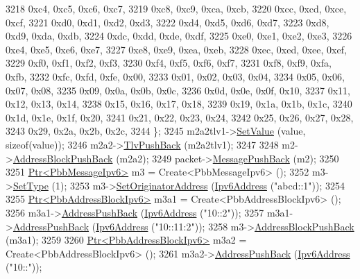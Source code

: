 \begin{DoxyCode}
3218       0xc4, 0xc5, 0xc6, 0xc7,
3219       0xc8, 0xc9, 0xca, 0xcb,
3220       0xcc, 0xcd, 0xce, 0xcf,
3221       0xd0, 0xd1, 0xd2, 0xd3,
3222       0xd4, 0xd5, 0xd6, 0xd7,
3223       0xd8, 0xd9, 0xda, 0xdb,
3224       0xdc, 0xdd, 0xde, 0xdf,
3225       0xe0, 0xe1, 0xe2, 0xe3,
3226       0xe4, 0xe5, 0xe6, 0xe7,
3227       0xe8, 0xe9, 0xea, 0xeb,
3228       0xec, 0xed, 0xee, 0xef,
3229       0xf0, 0xf1, 0xf2, 0xf3,
3230       0xf4, 0xf5, 0xf6, 0xf7,
3231       0xf8, 0xf9, 0xfa, 0xfb,
3232       0xfc, 0xfd, 0xfe, 0x00,
3233       0x01, 0x02, 0x03, 0x04,
3234       0x05, 0x06, 0x07, 0x08,
3235       0x09, 0x0a, 0x0b, 0x0c,
3236       0x0d, 0x0e, 0x0f, 0x10,
3237       0x11, 0x12, 0x13, 0x14,
3238       0x15, 0x16, 0x17, 0x18,
3239       0x19, 0x1a, 0x1b, 0x1c,
3240       0x1d, 0x1e, 0x1f, 0x20,
3241       0x21, 0x22, 0x23, 0x24,
3242       0x25, 0x26, 0x27, 0x28,
3243       0x29, 0x2a, 0x2b, 0x2c,
3244     \};
3245     m2a2tlv1->\hyperlink{classns3_1_1PbbTlv_a1ca7d32f9b68990225f3267c2cc09f11}{SetValue} (value, \textcolor{keyword}{sizeof}(value));
3246     m2a2->\hyperlink{classns3_1_1PbbAddressBlock_a6e33cd1452dd3ff753de3e3c99e473a5}{TlvPushBack} (m2a2tlv1);
3247 
3248     m2->\hyperlink{classns3_1_1PbbMessage_a5f623bad2fb1adde7da885e1c92d5311}{AddressBlockPushBack} (m2a2);
3249     packet->\hyperlink{classns3_1_1PbbPacket_a4a3170001ef758d9c9c4375b8f089826}{MessagePushBack} (m2);
3250 
3251     \hyperlink{classns3_1_1Ptr}{Ptr<PbbMessageIpv6>} m3 = Create<PbbMessageIpv6> ();
3252     m3->\hyperlink{classns3_1_1PbbMessage_a4b3d1eaabd3e7412a46ac79bf3360dac}{SetType} (1);
3253     m3->\hyperlink{classns3_1_1PbbMessage_a52ac135a2bec53db5e8f46b8b8a25e7c}{SetOriginatorAddress} (\hyperlink{classns3_1_1Ipv6Address}{Ipv6Address} (\textcolor{stringliteral}{"abcd::1"}));
3254 
3255     \hyperlink{classns3_1_1Ptr}{Ptr<PbbAddressBlockIpv6>} m3a1 = Create<PbbAddressBlockIpv6> ();
3256     m3a1->\hyperlink{classns3_1_1PbbAddressBlock_a7be545a53d69bd426dbebcf752ed8371}{AddressPushBack} (\hyperlink{classns3_1_1Ipv6Address}{Ipv6Address} (\textcolor{stringliteral}{"10::2"}));
3257     m3a1->\hyperlink{classns3_1_1PbbAddressBlock_a7be545a53d69bd426dbebcf752ed8371}{AddressPushBack} (\hyperlink{classns3_1_1Ipv6Address}{Ipv6Address} (\textcolor{stringliteral}{"10::11:2"}));
3258     m3->\hyperlink{classns3_1_1PbbMessage_a5f623bad2fb1adde7da885e1c92d5311}{AddressBlockPushBack} (m3a1);
3259 
3260     \hyperlink{classns3_1_1Ptr}{Ptr<PbbAddressBlockIpv6>} m3a2 = Create<PbbAddressBlockIpv6> ();
3261     m3a2->\hyperlink{classns3_1_1PbbAddressBlock_a7be545a53d69bd426dbebcf752ed8371}{AddressPushBack} (\hyperlink{classns3_1_1Ipv6Address}{Ipv6Address} (\textcolor{stringliteral}{"10::"}));

\end{DoxyCode}
